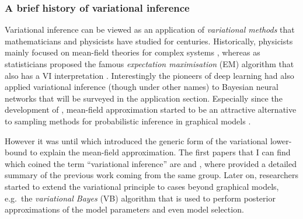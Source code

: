 \subsubsection{A brief history of variational inference}
Variational inference can be viewed as an application of \emph{variational methods} that mathematicians and physicists have studied for centuries. Historically, physicists mainly focused on mean-field theories for complex systems \citep{parisi:book1988},  whereas \cite{dempster:em1977} as statisticians proposed the famous \emph{expectation maximisation} (EM) algorithm that also has a VI interpretation \citep{neal:em1998}. Interestingly the pioneers of deep learning had also applied variational inference (though under other names) to Bayesian neural networks \citep{peterson:mean_field1987, hinton:mdl1993} that will be surveyed in the application section. Especially since the development of \citet{peterson:mean_field1987}, mean-field approximation started to be an attractive alternative to sampling methods for probabilistic inference in graphical models \citep{ghahramani:em_factorial1995, mackay:ensemblelearning1997}.

However it was until \cite{saul:mean_field1996} which introduced the generic form of the variational lower-bound to explain the mean-field approximation. The first papers that I can find which coined the term ``variational inference'' are \cite{lawrence:vi1998} and \cite{jordan:vi1999}, where \cite{jordan:vi1999} provided a detailed summary of the previous work coming from the same group. Later on, researchers started to extend the variational principle to cases beyond graphical models, e.g.~the \emph{variational Bayes} (VB) algorithm \citep{attias:vb1999, attias:vb2000, ghahramani:variational2000, sato:vb2001, ghahramani:propagation2001, beal:vi2003} that is used to perform posterior approximations of the model parameters and even model selection.



